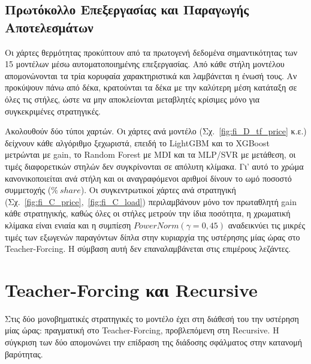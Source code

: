 \subsection{Πρωτόκολλο Επεξεργασίας και Παραγωγής Αποτελεσμάτων}
\label{subsec:fi_pipeline}

Οι χάρτες θερμότητας προκύπτουν από τα πρωτογενή δεδομένα σημαντικότητας των 15 μοντέλων μέσω αυτοματοποιημένης επεξεργασίας. Από κάθε στήλη μοντέλου απομονώνονται τα τρία κορυφαία χαρακτηριστικά και λαμβάνεται η ένωσή τους. Αν προκύψουν πάνω από δέκα, κρατούνται τα δέκα με την καλύτερη μέση κατάταξη σε όλες τις στήλες, ώστε να μην αποκλείονται μεταβλητές κρίσιμες μόνο για συγκεκριμένες στρατηγικές.

Ακολουθούν δύο τύποι χαρτών. Οι χάρτες ανά μοντέλο (Σχ.~\ref{fig:fi_D_tf_price} κ.ε.) δείχνουν κάθε αλγόριθμο ξεχωριστά, επειδή το LightGBM και το XGBoost μετρώνται με gain, το Random Forest με MDI και τα MLP/SVR με μετάθεση, οι τιμές διαφορετικών στηλών δεν συγκρίνονται σε απόλυτη κλίμακα. Γι' αυτό το χρώμα κανονικοποιείται ανά στήλη και οι αναγραφόμενοι αριθμοί δίνουν το ωμό ποσοστό συμμετοχής ($\%\ \mathit{share}$). Οι συγκεντρωτικοί χάρτες ανά στρατηγική (Σχ.~\ref{fig:fi_C_price},~\ref{fig:fi_C_load}) περιλαμβάνουν μόνο τον πρωταθλητή gain κάθε στρατηγικής, καθώς όλες οι στήλες μετρούν την ίδια ποσότητα, η χρωματική κλίμακα είναι ενιαία και η συμπίεση $\mathit{PowerNorm}(\gamma=0{,}45)$ αναδεικνύει τις μικρές τιμές των εξωγενών παραγόντων δίπλα στην κυριαρχία της υστέρησης μίας ώρας στο Teacher-Forcing. Η σύμβαση αυτή δεν επαναλαμβάνεται στις επιμέρους λεζάντες.


\section{Teacher-Forcing και Recursive}
\label{sec:fi_tf_rec}

Στις δύο μονοβηματικές στρατηγικές το μοντέλο έχει στη διάθεσή του την υστέρηση
μίας ώρας: πραγματική στο Teacher-Forcing, προβλεπόμενη στη Recursive. Η σύγκριση
των δύο απομονώνει την επίδραση της διάδοσης σφάλματος στην κατανομή βαρύτητας.

